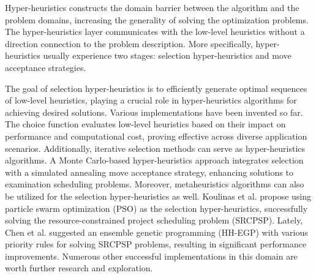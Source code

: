 \documentclass[preprint,review,12pt]{elsarticle}
\begin{document}
Hyper-heuristics constructs the domain barrier between the algorithm and the problem domains, increasing the generality of solving the optimization problems. The hyper-heuristics layer communicates with the low-level heuristics without a direction connection to the problem description. More specifically, hyper-heuristics usually experience two stages: selection hyper-heuristics and move acceptance strategies. 

The goal of selection hyper-heuristics is to efficiently generate optimal sequences of low-level heuristics, playing a crucial role in hyper-heuristics algorithms for achieving desired solutions\cite{dokeroglu2023hyper}. Various implementations have been invented so far. The choice function\cite{cowling2001hyperheuristic} evaluates low-level heuristics based on their impact on performance and computational cost, proving effective across diverse application scenarios. Additionally, iterative selection methods can serve as hyper-heuristics algorithms. A Monte Carlo-based hyper-heuristics approach\cite{burke2012monte} integrates selection with a simulated annealing move acceptance strategy, enhancing solutions to examination scheduling problems. Moreover, metaheuristics algorithms can also be utilized for the selection hyper-heuristics as well. Koulinas et al.\cite{koulinas2014particle} propose using particle swarm optimization (PSO) as the selection hyper-heuristics, successfully solving the resource-constrained project scheduling problem (SRCPSP). Lately, Chen et al.\cite{chen2021hyper} suggested an ensemble genetic programming (HH-EGP) with various priority rules for solving SRCPSP problems, resulting in significant performance improvements. Numerous other successful implementations in this domain are worth further research and exploration\cite{chen2021hyper}\cite{rostami2018new}\cite{fang2015estimation}. 
\end{document}
